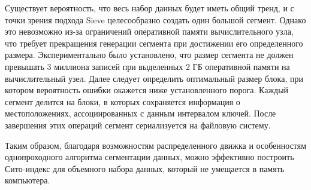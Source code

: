 Существует вероятность, что весь набор данных будет иметь общий тренд, и с точки зрения подхода Sieve целесообразно создать один большой сегмент. Однако это невозможно из-за ограничений оперативной памяти вычислительного узла, что требует прекращения генерации сегмента при достижении его определенного размера. Экспериментально было установлено, что размер сегмента не должен превышать 3 миллиона записей при выделенных 2 ГБ оперативной памяти на вычислительный узел. Далее следует определить оптимальный размер блока, при котором вероятность ошибки окажется ниже установленного порога. Каждый сегмент делится на блоки, в которых сохраняется информация о местоположениях, ассоциированных с данным интервалом ключей. После завершения этих операций сегмент сериализуется на файловую систему.

Таким образом, благодаря возможностям распределенного движка и особенностям однопроходного алгоритма сегментации данных, можно эффективно построить Сито-индекс для объемного набора данных, который не умещается в память компьютера.
